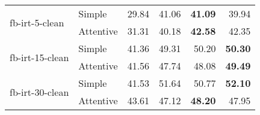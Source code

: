 \begin{tabular}{| l | l | r | r | r | r |}
    \multirow{2}{*}{fb-irt-5-clean}
    & Simple    & 29.84 & 41.06 & \textbf{41.09} & 39.94 \\
    & Attentive & 31.31 & 40.18 & \textbf{42.58} & 42.35 \\ \hline

    \multirow{2}{*}{fb-irt-15-clean}
    & Simple    & 41.36 & 49.31 & 50.20 & \textbf{50.30} \\
    & Attentive & 41.56 & 47.74 & 48.08 & \textbf{49.49} \\ \hline

    \multirow{2}{*}{fb-irt-30-clean}
    & Simple    & 41.53 & 51.64 & 50.77 & \textbf{52.10} \\
    & Attentive & 43.61 & 47.12 & \textbf{48.20} & 47.95 \\ \hline

\end{tabular}
